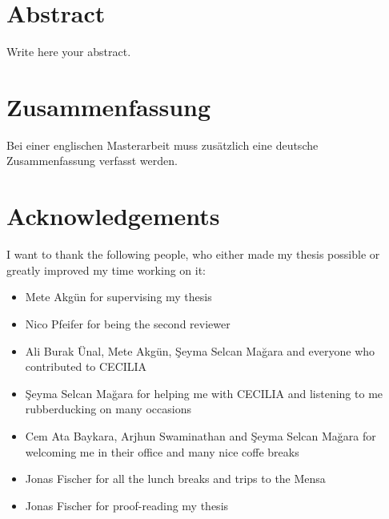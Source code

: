 \documentclass[twoside,12pt,a4paper]{report}
\begin{document}

\setcounter{page}{1}



\section*{Abstract}

Write here your abstract.
\newpage
\section*{Zusammenfassung}

Bei einer englischen Masterarbeit muss zus\"atzlich eine deutsche Zusammenfassung verfasst werden.

\newpage
\section*{Acknowledgements}
I want to thank the following people, who either made my thesis possible or greatly improved my time working on it:
\begin{itemize}
 \item Mete Akgün for supervising my thesis
 \item Nico Pfeifer for being the second reviewer
 \item Ali Burak Ünal, Mete Akgün, Şeyma Selcan Mağara and everyone who contributed to CECILIA
 \item Şeyma Selcan Mağara for helping me with CECILIA and listening to me rubberducking on many occasions
 \item Cem Ata Baykara, Arjhun Swaminathan and Şeyma Selcan Mağara for welcoming me in their office and many nice coffe breaks
 \item Jonas Fischer for all the lunch breaks and trips to the Mensa
 \item Jonas Fischer for proof-reading my thesis %
\end{itemize}



\cleardoublepage

\end{document}
